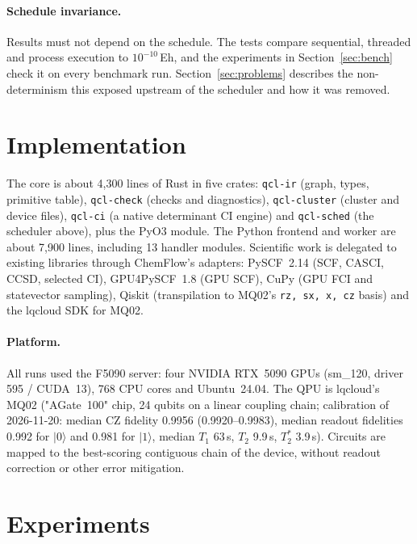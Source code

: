 \documentclass[10pt]{article}
\newcommand{\code}[1]{\texttt{#1}}
\begin{document}
\paragraph{Schedule invariance.} Results must not depend on the schedule. The tests
compare sequential, threaded and process execution to $10^{-10}$\,Eh, and the
experiments in Section~\ref{sec:bench} check it on every benchmark run.
Section~\ref{sec:problems} describes the non-determinism this exposed upstream of the
scheduler and how it was removed.

\section{Implementation}
\label{sec:impl}

The core is about 4,300 lines of Rust in five crates: \code{qcl-ir} (graph, types,
primitive table), \code{qcl-check} (checks and diagnostics), \code{qcl-cluster} (cluster
and device files), \code{qcl-ci} (a native determinant CI engine) and \code{qcl-sched}
(the scheduler above), plus the PyO3 module. The Python frontend and worker are about
7,900 lines, including 13 handler modules. Scientific work is delegated to existing
libraries through ChemFlow's adapters: PySCF~2.14 (SCF, CASCI, CCSD, selected CI),
GPU4PySCF~1.8 (GPU SCF), CuPy (GPU FCI and statevector sampling), Qiskit (transpilation to
MQ02's \code{rz, sx, x, cz} basis) and the lqcloud SDK for MQ02.

\paragraph{Platform.} All runs used the F5090 server: four NVIDIA RTX~5090 GPUs
(sm\_120, driver 595 / CUDA~13), 768 CPU cores and Ubuntu~24.04. The QPU is lqcloud's
MQ02 ("AGate~100" chip, 24 qubits on a linear coupling chain; calibration of
2026-11-20: median CZ fidelity 0.9956 (0.9920--0.9983), median readout fidelities 0.992
for $|0\rangle$ and 0.981 for $|1\rangle$, median $T_1$ 63\,\textmu s, $T_2$ 9.9\,\textmu s,
$T_2^{*}$ 3.9\,\textmu s). Circuits are mapped to the best-scoring contiguous chain of the
device, without readout correction or other error mitigation.

\section{Experiments}
\label{sec:experiments}
\end{document}
